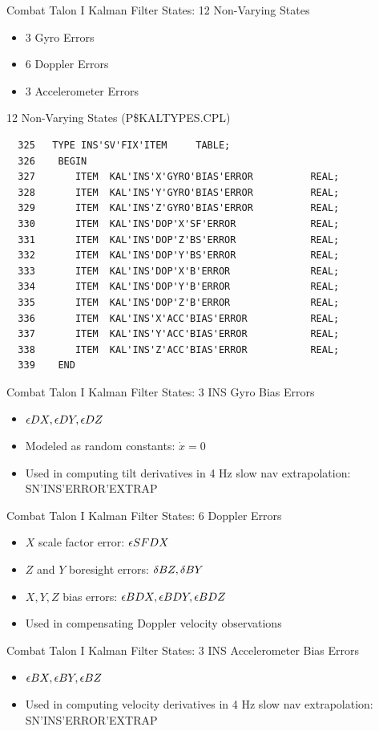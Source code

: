 \begin{frame}
Combat Talon I Kalman Filter States: 12 Non-Varying States
\begin{itemize}
	\item 3 Gyro Errors
	\item 6 Doppler Errors
	\item 3 Accelerometer Errors
\end{itemize} 
\end{frame}
\begin{frame}
12 Non-Varying States (P\$KALTYPES.CPL)
\begin{verbatim}
  325   TYPE INS'SV'FIX'ITEM     TABLE;
  326    BEGIN
  327       ITEM  KAL'INS'X'GYRO'BIAS'ERROR          REAL;
  328       ITEM  KAL'INS'Y'GYRO'BIAS'ERROR          REAL;
  329       ITEM  KAL'INS'Z'GYRO'BIAS'ERROR          REAL;
  330       ITEM  KAL'INS'DOP'X'SF'ERROR             REAL;
  331       ITEM  KAL'INS'DOP'Z'BS'ERROR             REAL;
  332       ITEM  KAL'INS'DOP'Y'BS'ERROR             REAL;
  333       ITEM  KAL'INS'DOP'X'B'ERROR              REAL;
  334       ITEM  KAL'INS'DOP'Y'B'ERROR              REAL;
  335       ITEM  KAL'INS'DOP'Z'B'ERROR              REAL;
  336       ITEM  KAL'INS'X'ACC'BIAS'ERROR           REAL;
  337       ITEM  KAL'INS'Y'ACC'BIAS'ERROR           REAL;
  338       ITEM  KAL'INS'Z'ACC'BIAS'ERROR           REAL;
  339    END
\end{verbatim}
\end{frame}

 

\begin{frame}
Combat Talon I Kalman Filter States: 3 INS Gyro Bias Errors
\begin{itemize}
\item $\epsilon DX,\epsilon DY,\epsilon DZ$
\item Modeled as random constants: $\dot{x}=0$
\item Used in computing tilt derivatives in 4 Hz slow nav extrapolation: SN'INS'ERROR'EXTRAP
\end{itemize}
\end{frame}
\begin{frame}
Combat Talon I Kalman Filter States: 6 Doppler Errors
\begin{itemize}
\item $X$ scale factor error: $\epsilon SFDX$
\item $Z$ and $Y$ boresight errors: $\delta BZ,\delta BY$
\item $X,Y,Z$ bias errors:  
$\epsilon BDX,\epsilon BDY,\epsilon BDZ$
\item Used in compensating Doppler velocity observations
\end{itemize}
\end{frame}
\begin{frame}
Combat Talon I Kalman Filter States: 3 INS Accelerometer Bias Errors
\begin{itemize}
\item $\epsilon BX,\epsilon BY,\epsilon BZ$
\item Used in computing velocity derivatives in 4 Hz slow nav extrapolation: SN'INS'ERROR'EXTRAP
\end{itemize}
\end{frame}

